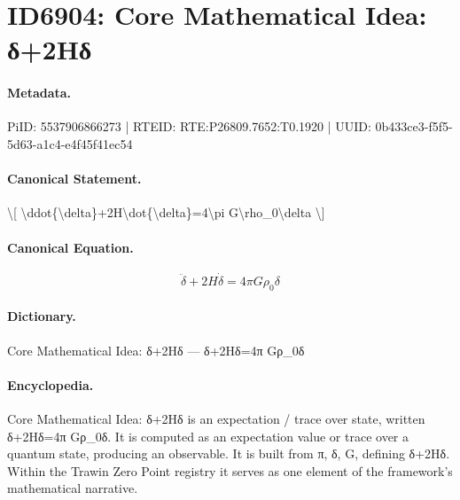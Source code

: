 \section*{ID6904: Core Mathematical Idea: δ+2Hδ}
\paragraph{Metadata.}
PiID: 5537906866273 | RTEID: RTE:P26809.7652:T0.1920 | UUID: 0b433ce3-f5f5-5d63-a1c4-e4f45f41ec54

\paragraph{Canonical Statement.}
\textbackslash{}[ \textbackslash{}ddot\{\textbackslash{}delta\}+2H\textbackslash{}dot\{\textbackslash{}delta\}=4\textbackslash{}pi G\textbackslash{}rho\_0\textbackslash{}delta \textbackslash{}]

\paragraph{Canonical Equation.}
\[
\ddot{\delta}+2H\dot{\delta}=4\pi G\rho_0\delta
\]

\paragraph{Dictionary.}
Core Mathematical Idea: δ+2Hδ — δ+2Hδ=4π Gρ\_0δ

\paragraph{Encyclopedia.}
Core Mathematical Idea: δ+2Hδ is an expectation / trace over state, written δ+2Hδ=4π Gρ\_0δ. It is computed as an expectation value or trace over a quantum state, producing an observable. It is built from π, δ, G, defining δ+2Hδ. Within the Trawin Zero Point registry it serves as one element of the framework's mathematical narrative.
